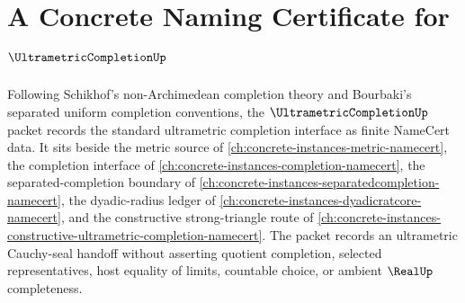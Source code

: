 \chapter{A Concrete Naming Certificate for $\UltrametricCompletionUp$}
\label{ch:concrete-instances-ultrametric-completion-namecert}

Following Schikhof's non-Archimedean completion theory and Bourbaki's separated uniform completion conventions, the $\UltrametricCompletionUp$ packet records the standard ultrametric completion interface as finite NameCert data. It sits beside the metric source of \autoref{ch:concrete-instances-metric-namecert}, the completion interface of \autoref{ch:concrete-instances-completion-namecert}, the separated-completion boundary of \autoref{ch:concrete-instances-separatedcompletion-namecert}, the dyadic-radius ledger of \autoref{ch:concrete-instances-dyadicratcore-namecert}, and the constructive strong-triangle route of \autoref{ch:concrete-instances-constructive-ultrametric-completion-namecert}. The packet records an ultrametric Cauchy-seal handoff without asserting quotient completion, selected representatives, host equality of limits, countable choice, or ambient $\RealUp$ completeness.


